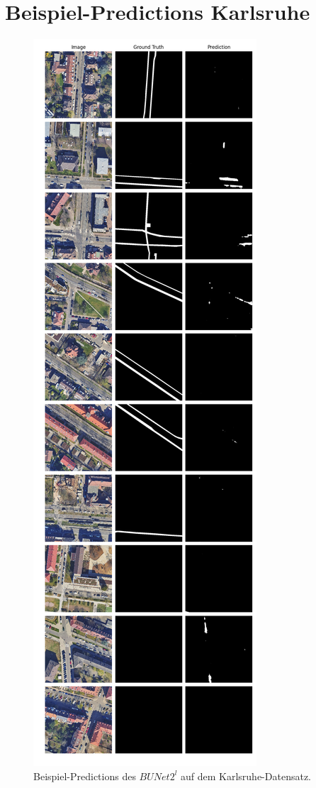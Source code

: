 \pagebreak 

\section{Beispiel-Predictions Karlsruhe}

\begin{figure}
	\centering
	\includegraphics[width=.41\textwidth]{Bilder/Samples-KA/bunet2-l.png} 
	\caption{Beispiel-Predictions des $BUNet2^l$ auf dem Karlsruhe-Datensatz.}
	\label{fig:ka-samples-bunet2-l}
\end{figure}

